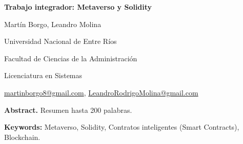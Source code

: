 \documentclass[a4paper,10pt]{article}
\begin{document}
	\pagestyle{empty}
	\begin{titlepage}
		\centering
		\vspace*{1.5cm}
		{\fontsize{14}{17}\bfseries Trabajo integrador: Metaverso y Solidity\par}
		{\small Martín Borgo, Leandro Molina\par}
		{\normalsize Universidad Nacional de Entre Ríos\par}
		{\normalsize Facultad de Ciencias de la Administración\par}
		{\normalsize Licenciatura en Sistemas \par}
		{\small \href{mailto:martinborgo8@gmail.com}{martinborgo8@gmail.com}, \href{mailto:LeandroRodrigoMolina@gmail.com}{LeandroRodrigoMolina@gmail.com}\par}
		
		{\small \justify\textbf{Abstract.} Resumen hasta 200 palabras. \par}
		{\small \justify\textbf{Keywords:} Metaverso, Solidity, Contratos inteligentes (Smart Contracts), Blockchain.\par}
	\end{titlepage}
	
\end{document}
